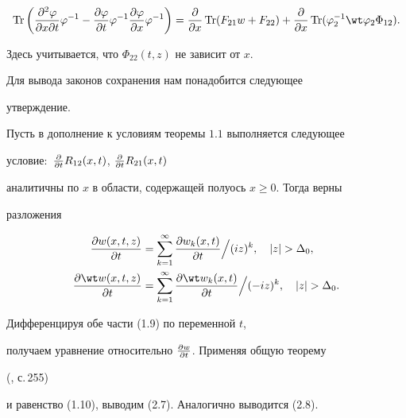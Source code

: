 \begin{equation} 


\Tr\bigg(\myfrac{^2\varphi}{x\partial t}\varphi^{-1}- 


\myfrac{\varphi}{t}\varphi^{-1}\myfrac{\varphi}{x}\varphi^{-1}\bigg)= 


\myfrac{}{x}\Tr(F_{21}w+F_{22})+\myfrac{}{x} 


\Tr(\varphi^{-1}_2\wt\varphi_2\Phi_{12}). 


\end{equation} 


Здесь учитывается, что $\Phi_{22}(t,z)$ не зависит от $x$. 


 


Для вывода законов сохранения нам понадобится следующее 


утверждение. 


 


\begin{thms} 


Пусть в дополнение к условиям теоремы $1.1$ выполняется следующее 


условие$:$ $\frac{\partial }{\partial t}R_{12}(x,t)$, $\frac{\partial }{\partial t}R_{21}(x,t)$ 


аналитичны по $x$ в области, содержащей полуось $x\ge 0$. Тогда верны 


разложения 


\begin{align} 


\myfrac{w(x,t,z)}{t}&=\sum^\infty_{k=1} 


\myfrac{w_k(x,t)}{t}\Big/ (iz)^k,\quad |z|>\Delta_0,\\ 


\myfrac{\wt w(x,t,z)}{t}&=\sum^\infty_{k=1} 


\myfrac{\wt w_k(x,t)}{t}\Big/ (-iz)^k,\quad |z|>\Delta_0. 


\end{align} 


\end{thms} 


 


\begin{pf} Дифференцируя обе части (1.9) по переменной $t$, 


получаем уравнение относительно $\frac{\partial w}{\partial t}$. Применяя общую теорему 


(\cite{5}, с.\,255) 


и равенство (1.10), выводим (2.7). Аналогично выводится (2.8). 


\end{pf} 


